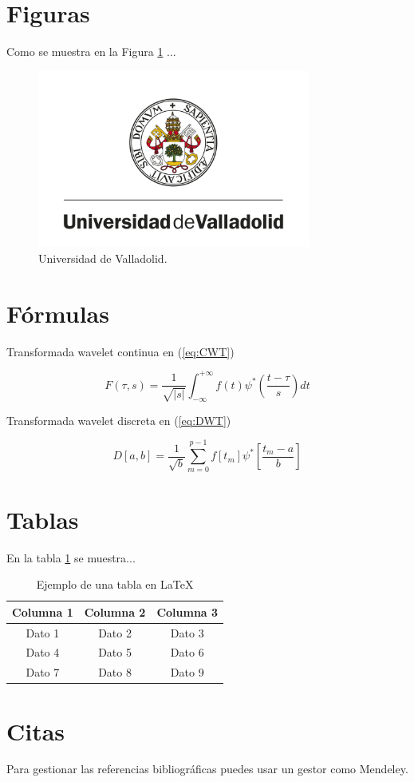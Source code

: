 \documentclass[../TFG.tex]{subfiles}
\begin{document}
\section{Figuras}

Como se muestra en la Figura \ref{fig:uva} ...

\begin{figure}[htbp]
    \centering
    \includegraphics[width=0.8\textwidth]{imagenes/Universidad-de-Valladolid.png}
    \caption{Universidad de Valladolid.}
    \label{fig:uva}
\end{figure}


\section{Fórmulas}

Transformada wavelet continua en (\ref{eq:CWT})

\begin{equation}\label{eq:CWT}
    F(\tau, s) = \frac{1}{\sqrt{|s|}} \int_{-\infty}^{+\infty} f(t) \psi^* \left( \frac{t-\tau}{s} \right) dt
\end{equation}

Transformada wavelet discreta en (\ref{eq:DWT})

\begin{equation}\label{eq:DWT}
   D[a, b] = \frac{1}{\sqrt{b}} \sum_{m=0}^{p-1} f[t_m] \psi^* \left[ \frac{t_m-a}{b} \right]
\end{equation}

\section{Tablas}

En la tabla \ref{tab:ejemplo} se muestra...

\begin{table}[htbp]
    \centering
    \begin{tabular}{|c|c|c|}
        \hline
        \textbf{Columna 1} & \textbf{Columna 2} & \textbf{Columna 3} \\
        \hline
        Dato 1 & Dato 2 & Dato 3 \\
        Dato 4 & Dato 5 & Dato 6 \\
        Dato 7 & Dato 8 & Dato 9 \\
        \hline
    \end{tabular}
    \caption{Ejemplo de una tabla en \LaTeX}
    \label{tab:ejemplo}
\end{table}

\section{Citas}

Para gestionar las referencias bibliográficas puedes usar un gestor como Mendeley. \cite{plantillaTFG}
\end{document}
